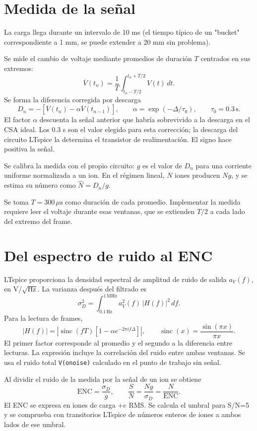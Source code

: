 \documentclass[11pt,a4paper]{article}
\begin{document}
\section{Medida de la señal}

La carga llega durante un intervalo de 10 ms (el tiempo típico de un "bucket" correspondiente a 1 mm, se puede extender a 20 mm sin problema).

Se mide el cambio de voltaje mediante promedios de duración $T$ centrados
en sus extremos:
\[
 \overline V(t_n)=\frac{1}{T}
 \int_{t_n-T/2}^{t_n+T/2}V(t)\,dt.
\]
Se forma la diferencia corregida por descarga
\[
 D_n=-\left[\overline V(t_n)-\alpha\overline V(t_{n-1})\right],
 \qquad \alpha=\exp(-\Delta/\tau_0),
 \qquad \tau_0=0.3\,\mathrm{s}.
\]
El factor $\alpha$ descuenta la señal anterior que habría sobrevivido a la
descarga en el CSA ideal. Los 0.3 s son el valor elegido para esta corrección;
la descarga del circuito LTspice la determina el transistor de realimentación.
El signo hace positiva la señal.

Se calibra la medida con el propio circuito: $g$ es el valor de $D_n$ para
una corriente uniforme normalizada a un ion. En el régimen lineal, $N$ iones
producen $Ng$, y se estima su número como $\widehat N=D_n/g$.

Se toma $T=300\,\mu\mathrm{s}$ como duración de cada promedio. Implementar la medida
requiere leer el voltaje durante esas ventanas, que se extienden $T/2$
a cada lado del extremo del frame.

\section{Del espectro de ruido al ENC}

LTspice proporciona la densidad espectral de amplitud de ruido de salida
$a_V(f)$, en $\mathrm{V}/\sqrt{\mathrm{Hz}}$. La varianza después del
filtrado es
\[
 \sigma_D^2=\int_{0.1\,\mathrm{Hz}}^{1\,\mathrm{MHz}}
 a_V^2(f)\,|H(f)|^2\,df.
\]
Para la lectura de frames,
\[
 |H(f)|=\left|\operatorname{sinc}(fT)
 \left[1-\alpha e^{-2\pi i f\Delta}\right]\right|,
 \qquad \operatorname{sinc}(x)=\frac{\sin(\pi x)}{\pi x}.
\]
El primer factor corresponde al promedio y el segundo a la diferencia entre
lecturas. La expresión incluye la correlación del ruido entre ambas ventanas.
Se usa el ruido total \texttt{V(onoise)} calculado en el punto de trabajo
sin señal.

Al dividir el ruido de la medida por la señal de un ion se obtiene
\[
 \mathrm{ENC}=\frac{\sigma_D}{g},\qquad
 \frac{S}{N}=\frac{Ng}{\sigma_D}=\frac{N}{\mathrm{ENC}}.
\]
El ENC se expresa en iones de carga $+e$ RMS.
Se calcula el umbral para S/N=5 y se comprueba con transitorios LTspice
de números enteros de iones a ambos lados de ese umbral.
\end{document}
